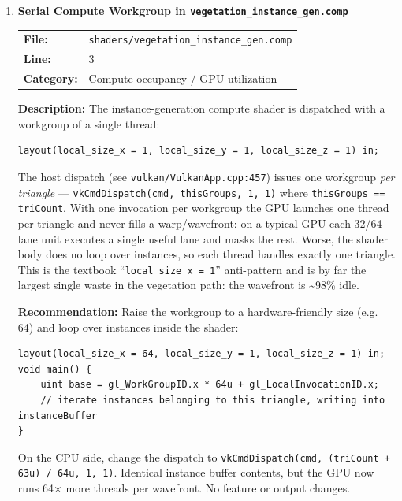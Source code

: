 \documentclass[a4paper,12pt]{article}
\newcommand{\severitybox}[2]{%
  \colorbox{#1}{\makebox[2.5cm][c]{\textcolor{white}{\textbf{#2}}}}%
}
\begin{document}
\begin{enumerate}[leftmargin=*]

\item[\textbf{[C1]}] \textbf{Serial Compute Workgroup in \texttt{vegetation\_instance\_gen.comp}}
  \hfill \severitybox{highcolor}{HIGH}

  \begin{tabular}{ll}
    \textbf{File:} & \texttt{shaders/vegetation\_instance\_gen.comp} \\
    \textbf{Line:} & 3 \\
    \textbf{Category:} & Compute occupancy / GPU utilization \\
  \end{tabular}

  \textbf{Description:}
  The instance-generation compute shader is dispatched with a workgroup of a
  single thread:

\begin{lstlisting}
layout(local_size_x = 1, local_size_y = 1, local_size_z = 1) in;
\end{lstlisting}

  The host dispatch (see \texttt{vulkan/VulkanApp.cpp:457}) issues one workgroup
  \emph{per triangle} — \texttt{vkCmdDispatch(cmd, thisGroups, 1, 1)} where
  \texttt{thisGroups == triCount}. With one invocation per workgroup the GPU
  launches one thread per triangle and never fills a warp/wavefront: on a typical
  GPU each 32/64-lane unit executes a single useful lane and masks the rest.
  Worse, the shader body does no loop over instances, so each thread handles
  exactly one triangle. This is the textbook ``\texttt{local\_size\_x = 1}''
  anti-pattern and is by far the largest single waste in the vegetation path:
  the wavefront is \textasciitilde{}98\% idle.

  \textbf{Recommendation:}
  Raise the workgroup to a hardware-friendly size (e.g. 64) and loop over
  instances inside the shader:

\begin{lstlisting}
layout(local_size_x = 64, local_size_y = 1, local_size_z = 1) in;
void main() {
    uint base = gl_WorkGroupID.x * 64u + gl_LocalInvocationID.x;
    // iterate instances belonging to this triangle, writing into instanceBuffer
}
\end{lstlisting}

  On the CPU side, change the dispatch to
  \texttt{vkCmdDispatch(cmd, (triCount + 63u) / 64u, 1, 1)}. Identical
  instance buffer contents, but the GPU now runs 64× more threads per wavefront.
  No feature or output changes.


\end{enumerate}
\end{document}
